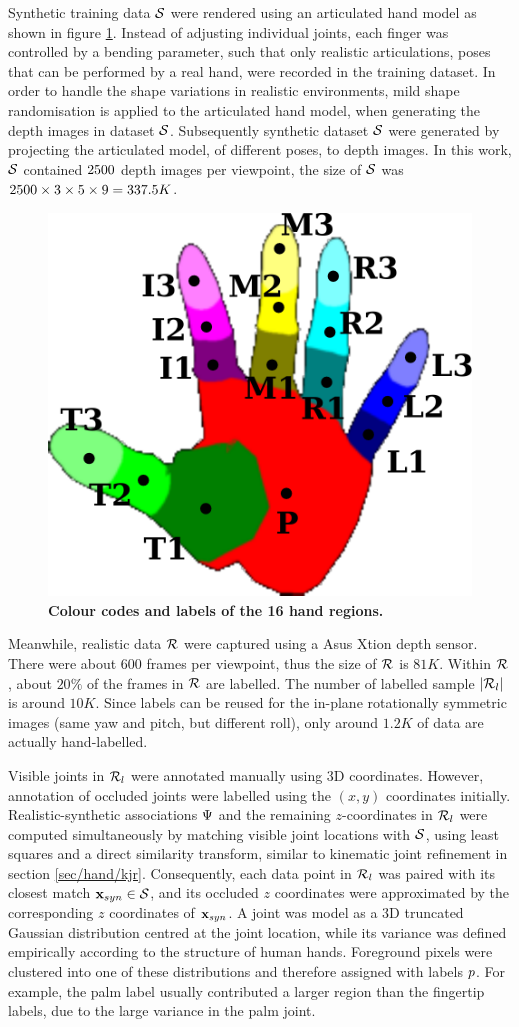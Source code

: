 Synthetic training data $\mathcal{S}$ were rendered using an articulated hand model as shown in figure \ref{fig/hand/label}. 
Instead of adjusting individual joints, each finger was controlled by a bending parameter, such that only realistic articulations, \ie poses that can be performed by a real hand, were recorded in the training dataset. 
In order to handle the shape variations in realistic environments, mild shape randomisation is applied to the articulated hand model, when generating the depth images in dataset $\mathcal{S}$. 
Subsequently synthetic dataset $\mathcal{S}$ were generated by projecting the articulated model, of different poses, to depth images. In this work, $\mathcal{S}$ contained $2500$ depth images per viewpoint, the size of $\mathcal{S}$ was $2500 \times 3 \times 5 \times 9 = 337.5K$.  

\begin{figure}[ht]
	\centering
	\includegraphics[width=0.32\linewidth]{fig/hand/hand.pdf}
	\caption{\textbf{Colour codes and labels of the 16 hand regions.}}
	\label{fig/hand/label}
\end{figure}

Meanwhile, realistic data $\mathcal{R}$ were captured using a Asus Xtion depth sensor. 
There were about $600$ frames per viewpoint, thus the size of $\mathcal{R}$ is $81K$. 
Within $\mathcal{R}$, about $20\%$ of the frames in $\mathcal{R}$ are labelled. 
The number of labelled sample $|\mathcal{R}_{l}|$ is around $10K$.    
Since labels can be reused for the in-plane rotationally symmetric images (same yaw and pitch, but different roll), only around $1.2K$ of data are actually hand-labelled.    

Visible joints in $\mathcal{R}_{l}$ were annotated manually using 3D coordinates. However, annotation of occluded joints were labelled using the $(x,y)$ coordinates initially.  
Realistic-synthetic associations $\mathrm{\Psi}$ and the remaining $z$-coordinates in $\mathcal{R}_{l}$ were computed simultaneously by matching visible joint locations with $\mathcal{S}$, using least squares and a direct similarity transform, similar to kinematic joint refinement in section \ref{sec/hand/kjr}. 
Consequently, each data point in $\mathcal{R}_{l}$ was paired with its closest match $\mathbf{x}_{syn} \in \mathcal{S}$, and its occluded $z$ coordinates were approximated by the corresponding $z$ coordinates of $\mathbf{x}_{syn}$.  
A joint was model as a 3D truncated Gaussian distribution centred at the joint location, while its variance was defined empirically according to the structure of human hands. Foreground pixels were clustered into one of these distributions and therefore assigned with labels $p$. For example, the palm label usually contributed a larger region than the fingertip labels, due to the large variance in the palm joint.

